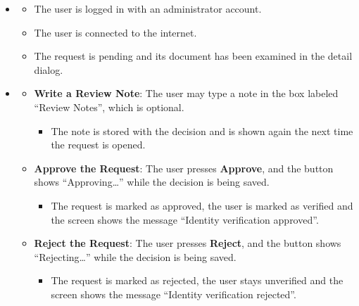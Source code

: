 \begin{itemize}[leftmargin=1.6em,topsep=4pt,itemsep=3pt,parsep=0pt,label=$\bullet$]
    \item {}
        \begin{itemize}[leftmargin=2.2em,topsep=2pt,itemsep=3pt,parsep=0pt,label=$\circ$]
            \item The user is logged in with an administrator account.
            \item The user is connected to the internet.
            \item The request is pending and its document has been examined in the detail dialog.
        \end{itemize}
    \item {}
        \begin{itemize}[leftmargin=2.2em,topsep=2pt,itemsep=3pt,parsep=0pt,label=$\circ$]
            \item \textbf{Write a Review Note}: The user may type a note in the box labeled ``Review Notes'', which is optional.
                \begin{itemize}[leftmargin=2.2em,topsep=2pt,itemsep=3pt,parsep=0pt,label=$\blacksquare$]
                    \item The note is stored with the decision and is shown again the next time the request is opened.
                \end{itemize}
            \item \textbf{Approve the Request}: The user presses \textbf{Approve}, and the button shows ``Approving\dots'' while the decision is being saved.
                \begin{itemize}[leftmargin=2.2em,topsep=2pt,itemsep=3pt,parsep=0pt,label=$\blacksquare$]
                    \item The request is marked as approved, the user is marked as verified and the screen shows the message ``Identity verification approved''.
                \end{itemize}
            \item \textbf{Reject the Request}: The user presses \textbf{Reject}, and the button shows ``Rejecting\dots'' while the decision is being saved.
                \begin{itemize}[leftmargin=2.2em,topsep=2pt,itemsep=3pt,parsep=0pt,label=$\blacksquare$]
                    \item The request is marked as rejected, the user stays unverified and the screen shows the message ``Identity verification rejected''.

\end{itemize}
\end{itemize}
\end{itemize}
